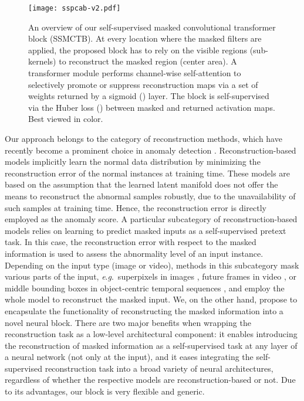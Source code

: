 \documentclass[10pt,journal,compsoc]{IEEEtran}
\newcommand{\eg}{\textit{e}.\textit{g}.}
\begin{document}
\begin{figure*}[!t]
\begin{center}
\centerline{\texttt{[image: sspcab-v2.pdf]}}
\vspace{-0.25cm}
\caption{An overview of our self-supervised masked convolutional transformer block (SSMCTB). At every location where the masked filters are applied, the proposed block has to rely on the visible regions (sub-kernels) to reconstruct the masked region (center area). A transformer module performs channel-wise self-attention to selectively promote or suppress reconstruction maps via a set of weights returned by a sigmoid () layer. The block is self-supervised via the Huber loss () \cite{Huber-AMS-1964} between masked and returned activation maps. Best viewed in color.}
\label{fig_sspcab}
\end{center}
\end{figure*}

Our approach belongs to the category of reconstruction methods, which have recently become a prominent choice in anomaly detection \cite{Fei-TMM-2020,Gong-ICCV-2019,Li-BMVC-2020,Nguyen-ICCV-2019,Park-CVPR-2020,Salehi-CVPR-2021,Tang-PRL-2020,Venkataramanan-ECCV-2020}. Reconstruction-based models implicitly learn the normal data distribution by minimizing the reconstruction error of the normal instances at training time. These models are based on the assumption that the learned latent manifold does not offer the means to reconstruct the abnormal samples robustly, due to the unavailability of such samples at training time. Hence, the reconstruction error is directly employed as the anomaly score. 
A particular subcategory of reconstruction-based models relies on learning to predict masked inputs \cite{Georgescu-CVPR-2021,Acsintoae-CVPR-2022,Li-BMVC-2020,Liu-CVPR-2018} as a self-supervised pretext task. In this case, the reconstruction error with respect to the masked information is used to assess the abnormality level of an input instance. Depending on the input type (image or video), methods in this subcategory mask various parts of the input, \eg~superpixels in images \cite{Li-BMVC-2020}, future frames in video \cite{Liu-CVPR-2018}, or middle bounding boxes in object-centric temporal sequences \cite{Georgescu-CVPR-2021,Acsintoae-CVPR-2022}, and employ the whole model to reconstruct the masked input. We, on the other hand, propose to encapsulate the functionality of reconstructing the masked information into a novel neural block. There are two major benefits when wrapping the reconstruction task as a low-level architectural component:  it enables introducing the reconstruction of masked information as a self-supervised task at any layer of a neural network (not only at the input), and  it eases integrating the self-supervised reconstruction task into a broad variety of neural architectures, regardless of whether the respective models are reconstruction-based or not. Due to its advantages, our block is very flexible and generic.
\end{document}
